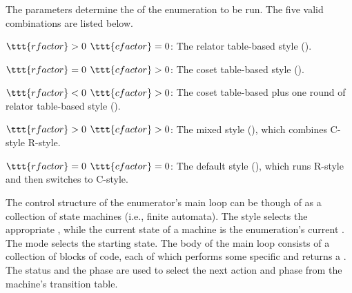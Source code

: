 The  \amp {} parameters determine the
   of the enumeration to be run.
The five valid combinations are listed below.

$\ttt{rfactor}>0$ \amp $\ttt{cfactor}=0$:
The relator table-based style ().

$\ttt{rfactor}=0$ \amp $\ttt{cfactor}>0$:
The coset table-based style ().

$\ttt{rfactor}<0$ \amp $\ttt{cfactor}>0$:
The coset table-based plus one round of relator table-based style 
  ().

$\ttt{rfactor}>0$ \amp $\ttt{cfactor}>0$:
The mixed style (), which combines C-style \amp R-style.

$\ttt{rfactor}=0$ \amp $\ttt{cfactor}=0$:
The default style (), which runs R-style and then switches
  to C-style.

The control structure of the enumerator's main loop can be though of as a
  collection of state machines (i.e., finite automata).
The style selects the appropriate , while the current state
  of a machine is the enumeration's current .
The mode selects the starting state. 
%
The body of the main loop consists of a collection of blocks of code, each
  of which performs some specific  and returns a .
The status and the phase are used to select the next action and phase from
  the machine's transition table.
 
